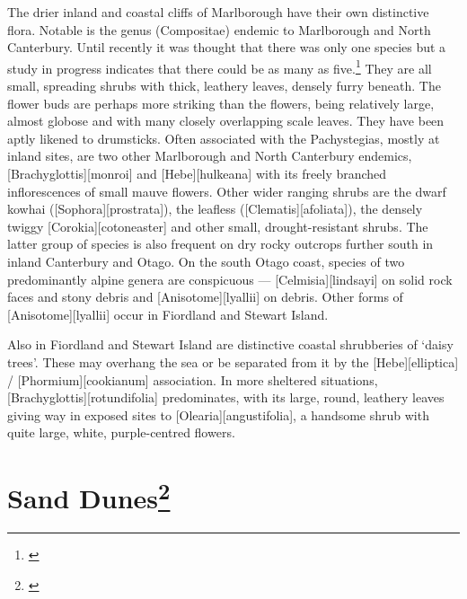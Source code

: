 The drier inland and coastal cliffs of Marlborough have their own distinctive flora.
Notable is the genus  (Compositae) endemic to Marlborough and North Canterbury.
Until recently it was thought that there was only one species but a study in progress indicates that there could be as many as five.\footnote{\cite{molloy1980taxonomy}}
They are all small, spreading shrubs with thick, leathery leaves, densely furry beneath.
The flower buds are perhaps more striking than the flowers, being relatively large, almost globose and with many closely overlapping scale leaves.
They have been aptly likened to drumsticks.
Often associated with the Pachystegias, mostly at inland sites, are two other Marlborough and North Canterbury endemics, [Brachyglottis][monroi] and [Hebe][hulkeana] with its freely branched inflorescences of small mauve flowers.
Other wider ranging shrubs are the dwarf kowhai ([Sophora][prostrata]), the leafless  ([Clematis][afoliata]), the densely twiggy [Corokia][cotoneaster] and other small, drought-resistant shrubs.
The latter group of species is also frequent on dry rocky outcrops further south in inland Canterbury and Otago.
On the south Otago coast, species of two predominantly alpine genera are conspicuous --- [Celmisia][lindsayi] on solid rock faces and stony debris and [Anisotome][lyallii] on debris.
Other forms of [Anisotome][lyallii] occur in Fiordland and Stewart Island.

Also in Fiordland and Stewart Island are distinctive coastal shrubberies of `daisy trees'.
These may overhang the sea or be separated from it by the [Hebe][elliptica] / [Phormium][cookianum] association.
In more sheltered situations, [Brachyglottis][rotundifolia] predominates, with its large, round, leathery leaves giving way in exposed sites to [Olearia][angustifolia], a handsome shrub with quite large, white, purple-centred flowers.

\section[Sand Dunes]{Sand Dunes\footnote{\cite{moore1963plants}}}

